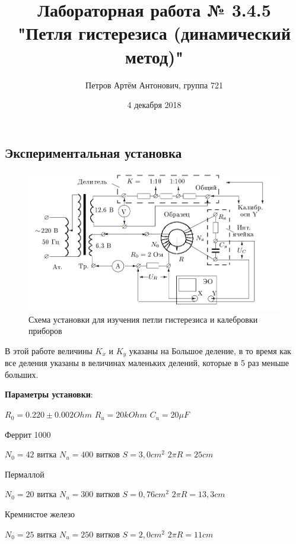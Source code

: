 \documentclass[a4paper,12pt]{article}
\author{Петров Артём Антонович, группа 721}
\title{Лабораторная работа № 3.4.5\\"Петля гистерезиса (динамический метод)"}
\date{4 декабря 2018}
\begin{document}

\begin{minipage}[t][7cm]{\textwidth}
\maketitle
\end{minipage}

\bigskip

\subsection*{Экспериментальная установка}

\bigskip

\begin{figure}[ht]
\centering
\includegraphics[width=140mm]{scheme.png}
\caption{Схема установки для изучения петли гистерезиса и калебровки приборов}\label{schema}
\end{figure}

В этой работе величины $K_x$ и $K_y$ указаны на Большое деление, в то время как все деления указаны в величинах маленьких делений, которые в 5 раз меньше больших.



\textbf{Параметры установки}:

$R_0 = 0.220 \pm 0.002 Ohm$
$R_u = 20kOhm$
$C_u = 20 \mu F$
\medskip

Феррит 1000

$N_0 = 42$ витка
$N_u = 400 $ витков
$S = 3,0 cm^2$
$2\pi R = 25 cm$
\medskip

Пермаллой

$N_0 = 20$ витка
$N_u = 300 $ витков
$S = 0,76 cm^2$
$2\pi R = 13,3 cm$
\medskip

Кремнистое железо

$N_0 = 25$ витка
$N_u = 250 $ витков
$S = 2,0 cm^2$
$2\pi R = 11 cm$
\end{document}
